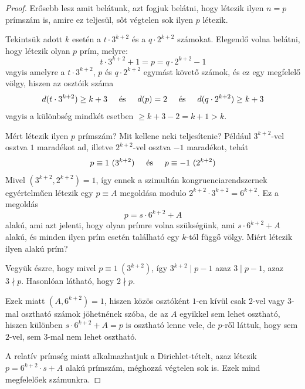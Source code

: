 \documentclass[12pt]{book}
\theoremstyle{plain} %
\theoremstyle{definition} %
\theoremstyle{remark}
\numberwithin{equation}{section}  %
\begin{document}
	\begin{proof}
		Erősebb lesz amit belátunk, azt fogjuk belátni, hogy létezik ilyen $n = p$ prímszám is, amire ez teljesül, sőt végtelen sok ilyen $p$ létezik.
		
		Tekintsük adott $k$ esetén a $t\cdot 3^{k+2}$ és a $q\cdot 2^{k+2}$ számokat. Elegendő volna belátni, hogy létezik olyan $p$ prím, melyre:
		\[ t\cdot 3^{k+2} + 1 = p = q\cdot 2^{k+2} - 1  \]
		vagyis amelyre a $t\cdot 3^{k+2}$, $p$ és $q\cdot 2^{k+2}$ egymást követő számok, és ez egy megfelelő völgy, hiszen az osztóik száma
		\[ d(t\cdot 3^{k+2}) \geq k+3 \hspace{5mm} \text{és} \hspace{5mm} d(p) = 2 \hspace{5mm} \text{és} \hspace{5mm} d(q\cdot 2^{k+2}) \geq k+3  \]
		vagyis a különbség mindkét esetben $\geq k+3-2=k+1>k$.
		
		Mért létezik ilyen $p$ prímszám? Mit kellene neki teljesítenie? Például $3^{k+2}$-vel osztva $1$ maradékot ad, illetve $2^{k+2}$-vel osztva $-1$ maradékot, tehát
		\[ p\equiv 1\ (3^{k+2}) \hspace{5mm} \text{és} \hspace{5mm} p\equiv -1\ (2^{k+2})  \]
		Mivel $(3^{k+2},2^{k+2}) = 1$, így ennek a szimultán kongruenciarendszernek egyértelműen létezik egy $p\equiv A$ megoldása modulo $2^{k+2}\cdot 3^{k+2} = 6^{k+2}$. Ez a megoldás
		\[ p = s \cdot 6^{k+2} + A  \]
		alakú, ami azt jelenti, hogy olyan prímre volna szükségünk, ami $s\cdot 6^{k+2} + A$ alakú, és minden ilyen prím esetén található egy $k$-tól függő völgy. Miért létezik ilyen alakú prím?
		
		Vegyük észre, hogy mivel $p\equiv 1\ (3^{k+2})$, így $3^{k+2}\mid p-1$ azaz $3\mid p-1$, azaz $3\nmid p$. Hasonlóan látható, hogy $2\nmid p$. 
		
		Ezek miatt $(A,6^{k+2}) = 1$, hiszen közös osztóként $1$-en kívül csak $2$-vel vagy $3$-mal osztható számok jöhetnének szóba, de az $A$ egyikkel sem lehet osztható, hiszen különben $s\cdot 6^{k+2} + A = p$ is osztható lenne vele, de $p$-ről láttuk, hogy sem $2$-vel, sem $3$-mal nem lehet osztható.
		
		A relatív prímség miatt alkalmazhatjuk a Dirichlet-tételt, azaz létezik $p = 6^{k+2} \cdot s + A$ alakú prímszám, méghozzá végtelen sok is. Ezek mind megfelelőek számunkra.
	\end{proof}
	
	
	
\end{document}
